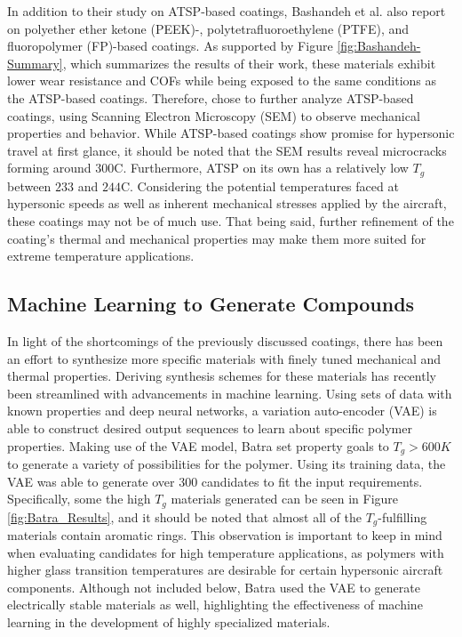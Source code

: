 \documentclass[12pt]{article}
\begin{document}
\begin{multicols}{2}
\indent In addition to their study on ATSP-based coatings, Bashandeh et al. \citep{Bashandeh2021} also report on polyether ether ketone (PEEK)-, polytetrafluoroethylene (PTFE), and fluoropolymer (FP)-based coatings. As supported by Figure \ref{fig:Bashandeh-Summary}, which summarizes the results of their work, these materials exhibit lower wear resistance and COFs while being exposed to the same conditions as the ATSP-based coatings. Therefore, \citep{Bashandeh2021} chose to further analyze ATSP-based coatings, using Scanning Electron Microscopy (SEM) to observe mechanical properties and behavior. While ATSP-based coatings show promise for hypersonic travel at first glance, it should be noted that the SEM results reveal microcracks forming around 300\degree C. Furthermore, ATSP on its own has a relatively low $T_g$ between $233$ and $244$\degree C. Considering the potential temperatures faced at hypersonic speeds as well as inherent mechanical stresses applied by the aircraft, these coatings may not be of much use. That being said, further refinement of the coating's thermal and mechanical properties may make them more suited for extreme temperature applications. 

\subsection{Machine Learning to Generate Compounds}

\indent In light of the shortcomings of the previously discussed coatings, there has been an effort to synthesize more specific materials with finely tuned mechanical and thermal properties. Deriving synthesis schemes for these materials has recently been streamlined with advancements in machine learning. Using sets of data with known properties and deep neural networks, a variation auto-encoder (VAE) is able to construct desired output sequences to learn about specific polymer properties. \citep{Batra2020} Making use of the VAE model, Batra \citep{Batra2020} set property goals to $T_g>600K$ to generate a variety of possibilities for the polymer. Using its training data, the VAE was able to generate over 300 candidates to fit the input requirements. Specifically, some the high $T_g$ materials generated can be seen in Figure \ref{fig:Batra_Results}, and it should be noted that almost all of the $T_g$-fulfilling materials contain aromatic rings. This observation is important to keep in mind when evaluating candidates for high temperature applications, as polymers with higher glass transition temperatures are desirable for certain hypersonic aircraft components. Although not included below, Batra \citep{Batra2020} used the VAE to generate electrically stable materials as well, highlighting the effectiveness of machine learning in the development of highly specialized materials.


\end{multicols}
\end{document}
